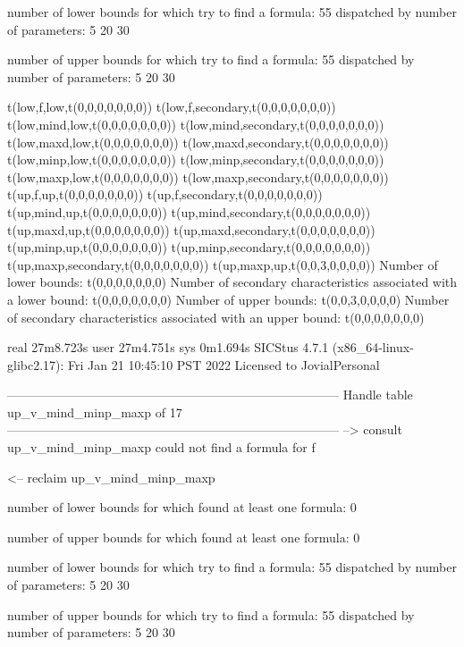 number of lower bounds for which try to find a formula: 55
dispatched by number of parameters: 5  20  30

number of upper bounds for which try to find a formula: 55
dispatched by number of parameters: 5  20  30

t(low,f,low,t(0,0,0,0,0,0,0))
t(low,f,secondary,t(0,0,0,0,0,0,0))
t(low,mind,low,t(0,0,0,0,0,0,0))
t(low,mind,secondary,t(0,0,0,0,0,0,0))
t(low,maxd,low,t(0,0,0,0,0,0,0))
t(low,maxd,secondary,t(0,0,0,0,0,0,0))
t(low,minp,low,t(0,0,0,0,0,0,0))
t(low,minp,secondary,t(0,0,0,0,0,0,0))
t(low,maxp,low,t(0,0,0,0,0,0,0))
t(low,maxp,secondary,t(0,0,0,0,0,0,0))
t(up,f,up,t(0,0,0,0,0,0,0))
t(up,f,secondary,t(0,0,0,0,0,0,0))
t(up,mind,up,t(0,0,0,0,0,0,0))
t(up,mind,secondary,t(0,0,0,0,0,0,0))
t(up,maxd,up,t(0,0,0,0,0,0,0))
t(up,maxd,secondary,t(0,0,0,0,0,0,0))
t(up,minp,up,t(0,0,0,0,0,0,0))
t(up,minp,secondary,t(0,0,0,0,0,0,0))
t(up,maxp,secondary,t(0,0,0,0,0,0,0))
t(up,maxp,up,t(0,0,3,0,0,0,0))
Number of lower bounds:                                             t(0,0,0,0,0,0,0)
Number of secondary characteristics associated with a lower bound:  t(0,0,0,0,0,0,0)
Number of upper bounds:                                             t(0,0,3,0,0,0,0)
Number of secondary characteristics associated with an upper bound: t(0,0,0,0,0,0,0)

real	27m8.723s
user	27m4.751s
sys	0m1.694s
SICStus 4.7.1 (x86_64-linux-glibc2.17): Fri Jan 21 10:45:10 PST 2022
Licensed to JovialPersonal


--------------------------------------------------------------------------------
Handle table up_v_mind_minp_maxp of 17
--------------------------------------------------------------------------------
--> consult up_v_mind_minp_maxp
could not find a formula for f

<-- reclaim up_v_mind_minp_maxp

number of lower bounds for which found at least one formula: 0

number of upper bounds for which found at least one formula: 0

number of lower bounds for which try to find a formula: 55
dispatched by number of parameters: 5  20  30

number of upper bounds for which try to find a formula: 55
dispatched by number of parameters: 5  20  30

